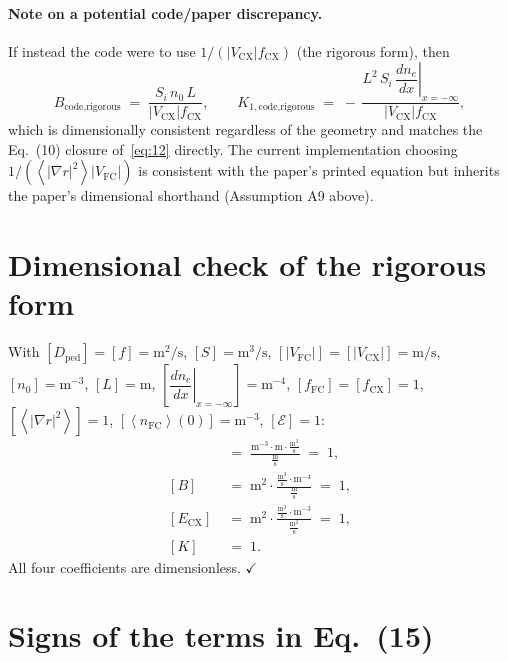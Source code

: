 \documentclass[11pt]{article}
\renewcommand{\ne}{n_{e}}  %
\newcommand{\nfc}{n_{\mathrm{FC}}}
\newcommand{\Vfc}{\lvert V_{\mathrm{FC}}\rvert}
\newcommand{\Vcx}{\lvert V_{\mathrm{CX}}\rvert}
\newcommand{\Si}{S_{i}}
\newcommand{\Sreact}{S}
\newcommand{\Dped}{D_{\mathrm{ped}}}
\newcommand{\fFC}{f_{\mathrm{FC}}}
\newcommand{\fCX}{f_{\mathrm{CX}}}
\newcommand{\fsa}[1]{\left\langle #1 \right\rangle}
\newcommand{\gradrsq}{\fsa{|\nabla r|^{2}}}
\newcommand{\neginf}{x=-\infty}
\newcommand{\dneneg}{\left.\dfrac{d\ne}{dx}\right|_{\neginf}}
\newcommand{\nFCzero}{\fsa{\nfc}(0)}
\newcommand{\Ecx}{E_{\mathrm{CX}}}
\begin{document}
\paragraph{Note on a potential code/paper discrepancy.}  If instead the
code were to use $1/(\Vcx\fCX)$ (the rigorous form), then
\begin{equation}
  B_{\text{code,rigorous}} \;=\; \frac{\Si\,n_{0}\,L}{\Vcx\fCX},
  \qquad
  K_{1,\text{code,rigorous}} \;=\; -\,\frac{L^{2}\,\Si\,\dneneg}{\Vcx\fCX},
\end{equation}
which is dimensionally consistent regardless of the geometry and matches
the Eq.~(10) closure of~\eqref{eq:12} directly.  The current
implementation choosing $1/(\gradrsq\Vfc)$ is consistent with the
paper's printed equation but inherits the paper's dimensional shorthand
(Assumption A9 above).

\section{Dimensional check of the rigorous form}
\label{sec:dimcheck}

With $[\Dped]=[f]=\mathrm{m^{2}/s}$, $[\Sreact]=\mathrm{m^{3}/s}$,
$[\Vfc]=[\Vcx]=\mathrm{m/s}$, $[n_{0}]=\mathrm{m^{-3}}$, $[L]=\mathrm{m}$,
$[\dneneg]=\mathrm{m^{-4}}$, $[\fFC]=[\fCX]=1$, $[\gradrsq]=1$,
$[\nFCzero]=\mathrm{m^{-3}}$, $[\mathcal{E}]=1$:
\begin{align}
  [A]   &\;=\; \frac{\mathrm{m^{-3}}\cdot\mathrm{m}\cdot\tfrac{\mathrm{m^{3}}}{\mathrm{s}}}
                   {\tfrac{\mathrm{m}}{\mathrm{s}}}
               \;=\; 1, \\
  [B]   &\;=\; \mathrm{m^{2}}\cdot\frac{\tfrac{\mathrm{m^{3}}}{\mathrm{s}}\cdot\mathrm{m^{-4}}}
                   {\tfrac{\mathrm{m}}{\mathrm{s}}}
               \;=\; 1, \\
  [\Ecx]&\;=\; \mathrm{m^{2}}\cdot\frac{\tfrac{\mathrm{m^{3}}}{\mathrm{s}}\cdot\mathrm{m^{-3}}}
                   {\tfrac{\mathrm{m^{2}}}{\mathrm{s}}}
               \;=\; 1, \\
  [K]   &\;=\; 1.
\end{align}
All four coefficients are dimensionless. \hfill$\checkmark$

\section{Signs of the terms in Eq.~(15)}
\label{sec:signs}
\end{document}
